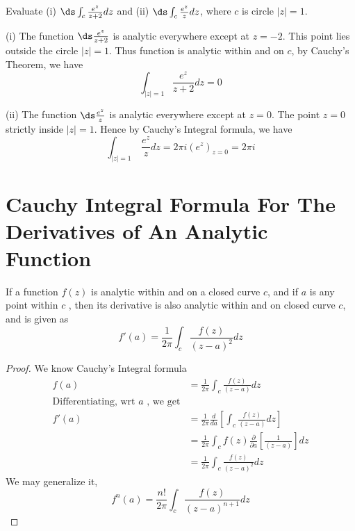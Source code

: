 \begin{example}
Evaluate (i) $\ds \int_c \frac{e^z}{z+2}dz$ and (ii) $\ds \int_c \frac{e^z}{z}dz$, where $c$ is circle $|z|=1$.
\end{example}
\begin{solution}
(i) The function $\ds \frac{e^z}{z+2}$ is analytic everywhere except at $z=-2$. This point lies outside the circle $|z|=1$. Thus function is analytic within and on $c$, by Cauchy's Theorem, we have
\[\int_{|z|=1} \frac{e^z}{z+2}dz = 0\]

(ii)
The function $\ds \frac{e^z}{z}$ is analytic everywhere except at $z=0$. The point $z=0$ strictly inside $|z|=1$. Hence by Cauchy's Integral formula, we have
\[\int_{|z|=1}~ \frac{e^z}{z}dz = 2 \pi i (e^z)_{z=0} =  2 \pi i \]
\end{solution}
\section{Cauchy Integral Formula For The Derivatives of An Analytic Function}
\begin{thm}
If a function $f(z)$ is analytic within and on a closed curve $c$, and if $a$ is any point within $c$ , then its derivative is also analytic within and on closed curve $c$, and is given as 
\[f'(a) = \frac{1}{2\pi}\int_{c} \frac{f(z)}{(z-a)^2} dz\]
\end{thm}
\begin{proof}
We know Cauchy's Integral formula
\begin{align*}
	f(a) &= \frac{1}{2\pi}\int_{c} \frac{f(z)}{(z-a)} dz \\
\text{Differentiating, wrt $a$ , we get} \\
	f'(a) &= \frac{1}{2\pi}\frac{d}{da}\left[\int_{c} \frac{f(z)}{(z-a)} dz \right]\\
	      &= \frac{1}{2\pi} \int_{c} f(z) \frac{\partial}{\partial a}\left[\frac{1}{(z-a)} \right]dz\\
	      &= \frac{1}{2\pi}\int_{c} \frac{f(z)}{(z-a)^2} dz
\end{align*}
We may generalize it,
\[f^n(a) = \frac{n!}{2\pi}\int_{c} \frac{f(z)}{(z-a)^{n+1}} dz\]
\end{proof}
